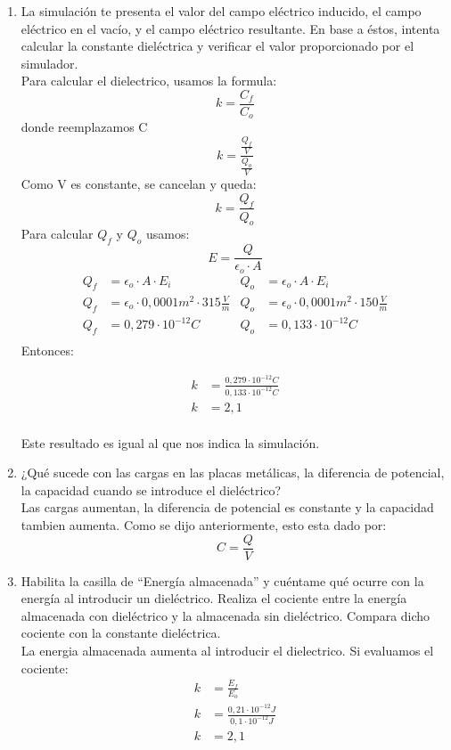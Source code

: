 \documentclass[12pt]{report}
\begin{document}
\begin{enumerate}
\begin{enumerate}
        \item La simulación te presenta el valor del campo eléctrico inducido, el campo eléctrico en el vacío, y el campo eléctrico resultante. En base a éstos, intenta calcular la constante dieléctrica y verificar el valor proporcionado por el simulador.\\[6pt]
        Para calcular el dielectrico, usamos la formula:
        \[k = \frac{C_f}{C_o}\] donde reemplazamos C
        \[k = \frac{\frac{Q_f}{V}}{\frac{Q_o}{V}}\] Como V es constante, se cancelan y queda:
        \[k = \frac{Q_f}{Q_o}\] Para calcular $Q_f$ y $Q_o$ usamos:
        \[E = \frac{Q}{\epsilon_o \cdot A}\]
        \begin{align*}
          Q_f&= \epsilon_o \cdot A \cdot E_i                           & Q_o&=\epsilon_o \cdot A \cdot E_i\\[6pt]
          Q_f&= \epsilon_o \cdot 0,0001 m^2 \cdot 315 \frac{V}{m}      &Q_o&= \epsilon_o \cdot 0,0001 m^2 \cdot 150 \frac{V}{m}\\[6pt]
          Q_f&= 0,279 \cdot 10^{-12} C                                  &Q_o&= 0,133 \cdot 10^{-12} C\\[6pt]
        \end{align*}
        Entonces:

        \begin{align*}
          k&= \frac{0,279 \cdot 10^{-12} C }{0,133 \cdot 10^{-12} C}\\[6pt]
          k&= 2,1\\[6pt]
        \end{align*}

        Este resultado es igual al que nos indica la simulación.

        \item ¿Qué sucede con las cargas en las placas metálicas, la diferencia de potencial, la capacidad cuando se introduce el dieléctrico?\\[6pt]
        Las cargas aumentan, la diferencia de potencial es constante y la capacidad tambien aumenta. Como se dijo anteriormente, esto esta dado por:
        \[C = \frac{Q}{V}\]

        \item Habilita la casilla de “Energía almacenada” y cuéntame qué ocurre con la energía al introducir un dieléctrico. Realiza el cociente entre la energía almacenada con dieléctrico y la almacenada sin dieléctrico. Compara dicho cociente con la constante dieléctrica.\\[6pt]
        La energia almacenada aumenta al introducir el dielectrico. Si evaluamos el cociente:
        \begin{align*}
          k &= \frac{E_f}{E_o}\\[6pt]
          k &= \frac{0,21 \cdot 10^{-12} J}{0,1 \cdot 10^{-12} J}\\[6pt]
          k &= 2,1
        \end{align*}


\end{enumerate}
\end{enumerate}
\end{document}
